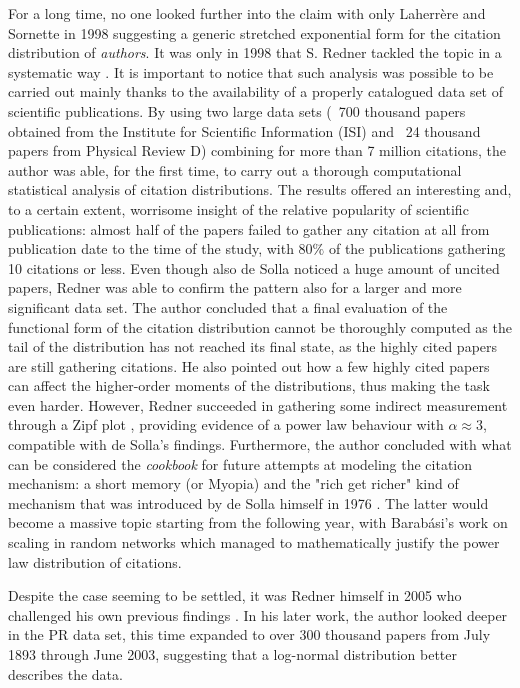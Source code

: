 For a long time, no one looked further into the claim with only Laherrère and Sornette in 1998 \cite{refId1} suggesting a generic stretched exponential form for the citation distribution
of \textit{authors}. It was only in 1998 that S. Redner tackled the topic in a systematic way \cite{refId0}. It is important to notice that such analysis was possible to be carried out
mainly thanks to the availability of a properly catalogued data set of scientific publications. By using two large data sets (~700 thousand papers obtained from the Institute for Scientific Information (ISI) and ~24 thousand papers
from Physical Review D) combining for more than 7 million citations, the author was able, for the first time, to carry out a thorough computational statistical analysis of citation
distributions. The results offered an interesting and, to a certain extent, worrisome insight of the relative popularity of scientific publications: almost half of the papers
failed to gather any citation at all from publication date to the time of the study, with $80\%$ of the publications gathering 10 citations or less. Even though also de Solla noticed a huge amount of uncited papers,
Redner was able to confirm the pattern also for a larger and more significant data set. The author concluded that a final evaluation of the functional form of the citation distribution
cannot be thoroughly computed as the tail of the distribution has not reached its final state, as the highly cited papers are still gathering citations. He also pointed out how a few 
highly cited papers can affect the higher-order moments of the distributions, thus making the task even harder. However, Redner succeeded in gathering some indirect measurement through
a Zipf plot \cite{Zipf}, providing evidence of a power law behaviour with $\alpha \approx 3$, compatible with de Solla's findings. Furthermore, the author concluded with what can be considered
the \textit{cookbook} for future attempts at modeling the citation mechanism: a short memory (or Myopia) and the "rich get richer" kind of mechanism that was
introduced by de Solla himself in 1976 \cite{Price1976}. The latter would become a massive
topic starting from the following year, with Barab{\'a}si's work on scaling in random networks \cite{Barabasi509} which managed to mathematically justify the power law distribution of citations. 


Despite the case seeming to be settled, it was Redner himself in 2005 who challenged his own previous findings \cite{RednerStatistics}. In his later work, the author looked deeper in the 
PR data set, this time expanded to over 300 thousand papers from July 1893 through June 2003, suggesting that a log-normal distribution better describes the data.

